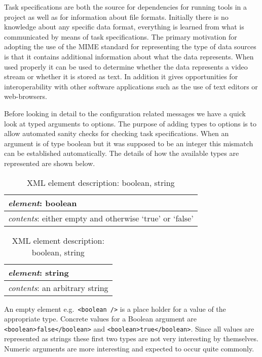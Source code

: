 \documentclass{article}
\begin{document}
   Task specifications are both the source for dependencies for running tools
   in a project as well as for information about file formats. Initially there
   is no knowledge about any specific data format, everything is learned from
   what is communicated by means of task specifications. The primary motivation
   for adopting the use of the MIME standard for representing the type of data
   sources is that it contains additional information about what the data
   represents. When used properly it can be used to determine whether the data
   represents a video stream or whether it is stored as text. In addition it
   gives opportunities for interoperability with other software applications
   such as the use of text editors or web-browsers.

   Before looking in detail to the configuration related messages we have a
   quick look at typed arguments to options. The purpose of adding types to
   options is to allow automated sanity checks for checking task
   specifications. When an argument is of type boolean but it was supposed to
   be an integer this mismatch can be established automatically. The details of
   how the available types are represented are shown below.

   \begin{table}[H]
    \begin{center}
    \begin{tabular}{|l|l|}
      \hline
       \multicolumn{2}{|l|}{\textit{element}: boolean} \\
      \hline
       \multicolumn{2}{|l|}{\textit{contents}: either empty and otherwise `true' or `false'} \\
      \hline
    \end{tabular}
    \begin{tabular}{|l|l|}
      \hline
       \multicolumn{2}{|l|}{\textit{element}: string} \\
      \hline
       \multicolumn{2}{|l|}{\textit{contents}: an arbitrary string} \\
      \hline
    \end{tabular}
    \end{center}
    \caption{XML element description: boolean, string}
   \end{table}

   An empty element e.g.\ \verb'<boolean />' is a place holder for a value of
   the appropriate type. Concrete values for a Boolean argument are
   \verb'<boolean>false</boolean>' and \verb'<boolean>true</boolean>'. Since
   all values are represented as strings these first two types are not very
   interesting by themselves. Numeric arguments are more interesting and
   expected to occur quite commonly.
\end{document}
